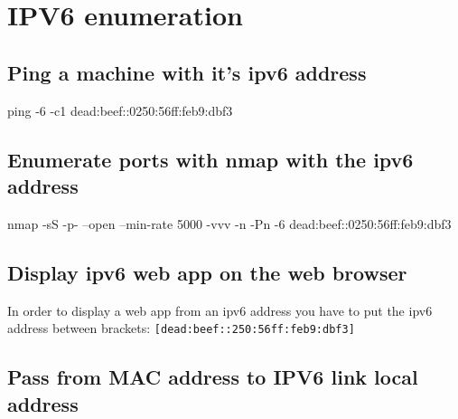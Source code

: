\documentclass{assets/ipesethesis}
\newenvironment{Shaded}{\begin{snugshade}}{\end{snugshade}}
\newcommand{\FunctionTok}[1]{\textcolor[rgb]{0.00,0.00,0.00}{#1}}
\newcommand{\NormalTok}[1]{#1}
\begin{document}
\hypertarget{ipv6-enumeration}{%
\section*{IPV6 enumeration}\label{ipv6-enumeration}}

\hypertarget{ping-a-machine-with-its-ipv6-address}{%
\subsection*{Ping a machine with it's ipv6 address}\label{ping-a-machine-with-its-ipv6-address}}

\begin{Shaded}
\begin{Highlighting}[]
\FunctionTok{ping}\NormalTok{ -6 -c1 dead:beef::0250:56ff:feb9:dbf3}
\end{Highlighting}
\end{Shaded}

\hypertarget{enumerate-ports-with-nmap-with-the-ipv6-address}{%
\subsection*{Enumerate ports with nmap with the ipv6 address}\label{enumerate-ports-with-nmap-with-the-ipv6-address}}

\begin{Shaded}
\begin{Highlighting}[]
\FunctionTok{nmap}\NormalTok{ -sS -p- --open --min-rate 5000 -vvv -n -Pn -6 dead:beef::0250:56ff:feb9:dbf3}
\end{Highlighting}
\end{Shaded}

\hypertarget{display-ipv6-web-app-on-the-web-browser}{%
\subsection*{Display ipv6 web app on the web browser}\label{display-ipv6-web-app-on-the-web-browser}}

In order to display a web app from an ipv6 address you have to put the ipv6 address between brackets: \texttt{{[}dead:beef::250:56ff:feb9:dbf3{]}}

\hypertarget{pass-from-mac-address-to-ipv6-link-local-address}{%
\subsection*{Pass from MAC address to IPV6 link local address}\label{pass-from-mac-address-to-ipv6-link-local-address}}
\end{document}
